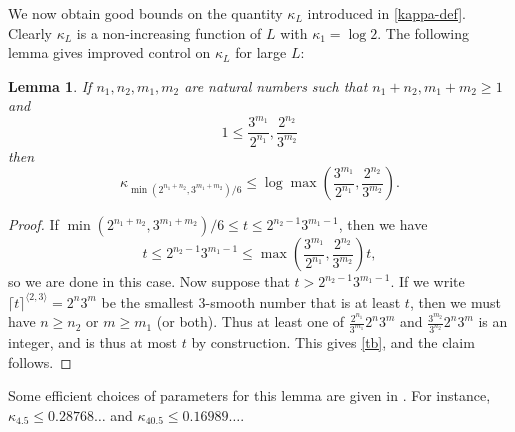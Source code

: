 \documentclass[12pt,a4paper,reqno]{amsart}
\numberwithin{equation}{section}
\theoremstyle{plain}
\newtheorem{lemma}[theorem]{Lemma}
\theoremstyle{definition}
\begin{document}
We now obtain good bounds on the quantity $\kappa_L$ introduced in \eqref{kappa-def}.  Clearly $\kappa_L$ is a non-increasing function of $L$ with $\kappa_1 = \log 2$.  The following lemma gives improved control on $\kappa_L$ for large $L$:

\begin{lemma}\label{lemcount-0}  If $n_1,n_2,m_1,m_2$ are natural numbers such that $n_1+n_2, m_1+m_2 \geq 1$ and
$$ 1 \leq \frac{3^{m_1}}{2^{n_1}}, \frac{2^{n_2}}{3^{m_2}}$$
then
$$ \kappa_{\min( 2^{n_1+n_2},3^{m_1+m_2})/6} \leq \log \max\left(\frac{3^{m_1}}{2^{n_1}}, \frac{2^{n_2}}{3^{m_2}}\right).$$
\end{lemma}

\begin{proof}  If $\min( 2^{n_1+n_2},3^{m_1+m_2})/6 \leq t \leq 2^{n_2-1} 3^{m_1-1}$, then we have
\begin{equation}\label{tb} 
  t \leq 2^{n_2-1} 3^{m_1-1} \leq \max\left(\frac{3^{m_1}}{2^{n_1}}, \frac{2^{n_2}}{3^{m_2}}\right) t,
\end{equation}
so we are done in this case.  Now suppose that $t > 2^{n_2-1} 3^{m_1-1}$.
If we write $\lceil t \rceil^{\langle 2,3 \rangle} =2^n 3^m$ be the smallest $3$-smooth number that is at least $t$, then we must have $n \geq n_2$ or $m \geq m_1$ (or both).  Thus at least one of $\frac{2^{n_1}}{3^{m_1}} 2^n 3^m$ and $\frac{3^{m_2}}{3^{n_2}} 2^n 3^m$ is an integer, and is thus at most $t$ by construction.  This gives \eqref{tb}, and the claim follows.
\end{proof}

Some efficient choices of parameters for this lemma are given in .  For instance, $\kappa_{4.5} \leq 0.28768\dots$ and $\kappa_{40.5} \leq 0.16989\dots$.
\end{document}
